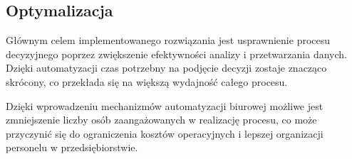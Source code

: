 \subsection{Optymalizacja}
Głównym celem implementowanego rozwiązania jest usprawnienie procesu decyzyjnego poprzez zwiększenie efektywności analizy i przetwarzania danych. Dzięki automatyzacji czas potrzebny na podjęcie decyzji zostaje znacząco skrócony, co przekłada się na większą wydajność całego procesu.

Dzięki wprowadzeniu mechanizmów automatyzacji biurowej możliwe jest zmniejszenie liczby osób zaangażowanych w realizację procesu, co może przyczynić się do ograniczenia kosztów operacyjnych i lepszej organizacji personelu w przedsiębiorstwie.